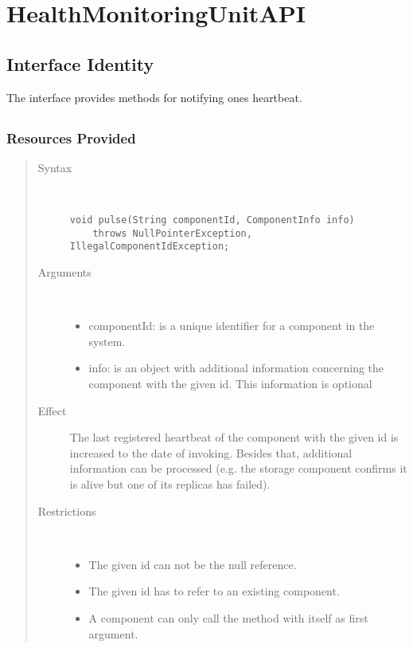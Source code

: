 \section{HealthMonitoringUnitAPI}
\label{api:health-monitoring-unit-api}

\subsection{Interface Identity}

\npar The  interface provides methods for notifying
ones heartbeat.

\subsection{}

\subsubsection{Resources Provided}

\begin{quote}
	\begin{description}
		\item[Syntax] \
		\begin{verbatim}
void pulse(String componentId, ComponentInfo info)
    throws NullPointerException, IllegalComponentIdException;
		\end{verbatim}
		\item[Arguments] \
		\begin{itemize}
		  \item componentId: is a unique identifier for a component in the system.
		  \item info: is an object with additional information concerning the
		  component with the given id. This information is optional
		\end{itemize}
		\item[Effect] The last registered heartbeat of the component with the given id
		is increased to the date of invoking. Besides that, additional information can
		be processed (e.g. the storage component confirms it is alive but one of its
		replicas has failed).
		\item[Restrictions] \
		\begin{itemize}
		  \item The given id can not be the null reference.
		  \item The given id has to refer to an existing component.
		  \item A component can only call the  method with itself as
		  first argument. 
		\end{itemize}
	\end{description} 
\end{quote}

